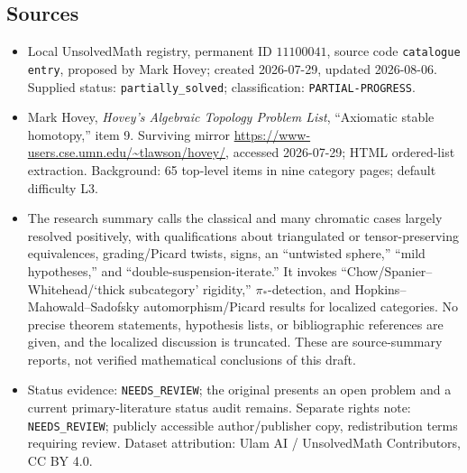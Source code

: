 \documentclass[11pt]{article}
\begin{document}
\subsection{Sources}
\begin{itemize}
\item Local UnsolvedMath registry, permanent ID $11100041$, source code \texttt{catalogue entry}, proposed by Mark Hovey; created 2026-07-29, updated 2026-08-06. Supplied status: \texttt{partially\_solved}; classification: \texttt{PARTIAL-PROGRESS}.
\item Mark Hovey, \emph{Hovey's Algebraic Topology Problem List}, ``Axiomatic stable homotopy,'' item 9. Surviving mirror \url{https://www-users.cse.umn.edu/~tlawson/hovey/}, accessed 2026-07-29; HTML ordered-list extraction. Background: 65 top-level items in nine category pages; default difficulty L3.
\item The research summary calls the classical and many chromatic cases largely resolved positively, with qualifications about triangulated or tensor-preserving equivalences, grading/Picard twists, signs, an ``untwisted sphere,'' ``mild hypotheses,'' and ``double-suspension-iterate.'' It invokes ``Chow/Spanier--Whitehead/`thick subcategory' rigidity,'' $\pi_*$-detection, and Hopkins--Mahowald--Sadofsky automorphism/Picard results for localized categories. No precise theorem statements, hypothesis lists, or bibliographic references are given, and the localized discussion is truncated. These are source-summary reports, not verified mathematical conclusions of this draft.
\item Status evidence: \texttt{NEEDS\_REVIEW}; the original presents an open problem and a current primary-literature status audit remains. Separate rights note: \texttt{NEEDS\_REVIEW}; publicly accessible author/publisher copy, redistribution terms requiring review. Dataset attribution: Ulam AI / UnsolvedMath Contributors, CC BY 4.0.
\end{itemize}
\end{document}

